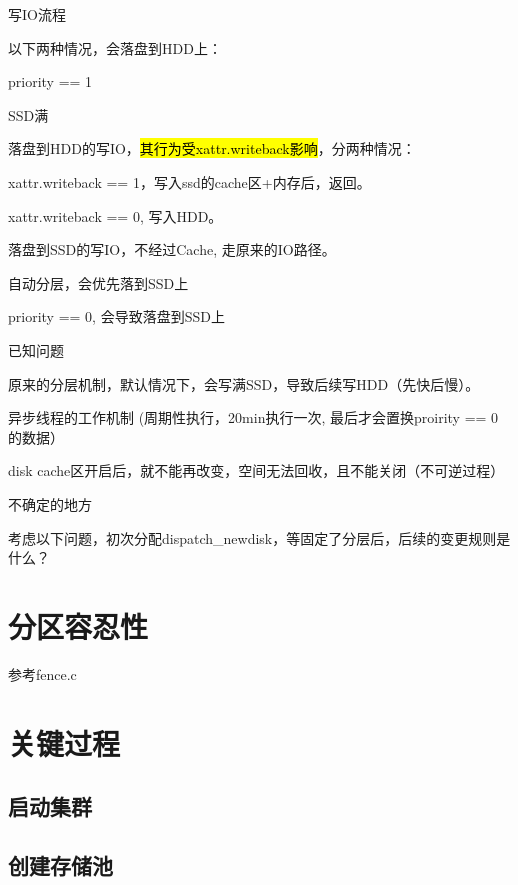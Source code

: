 写IO流程

以下两种情况，会落盘到HDD上：
\begin{compactenum}
\item priority == 1
\item SSD满
\end{compactenum}

落盘到HDD的写IO，\hl{其行为受xattr.writeback影响}，分两种情况：
\begin{compactenum}
\item xattr.writeback == 1，写入ssd的cache区+内存后，返回。
\item xattr.writeback == 0, 写入HDD。
\end{compactenum}

落盘到SSD的写IO，不经过Cache, 走原来的IO路径。
\begin{compactenum}
\item 自动分层，会优先落到SSD上
\item priority == 0, 会导致落盘到SSD上
\end{compactenum}

已知问题

\begin{compactenum}
\item 原来的分层机制，默认情况下，会写满SSD，导致后续写HDD（先快后慢）。
\item 异步线程的工作机制 (周期性执行，20min执行一次, 最后才会置换proirity == 0的数据）
\item disk cache区开启后，就不能再改变，空间无法回收，且不能关闭（不可逆过程）
\end{compactenum}

不确定的地方

考虑以下问题，初次分配dispatch\_newdisk，等固定了分层后，后续的变更规则是什么？

\section{分区容忍性}

参考fence.c

\section{关键过程}

\subsection{启动集群}

\subsection{创建存储池}

